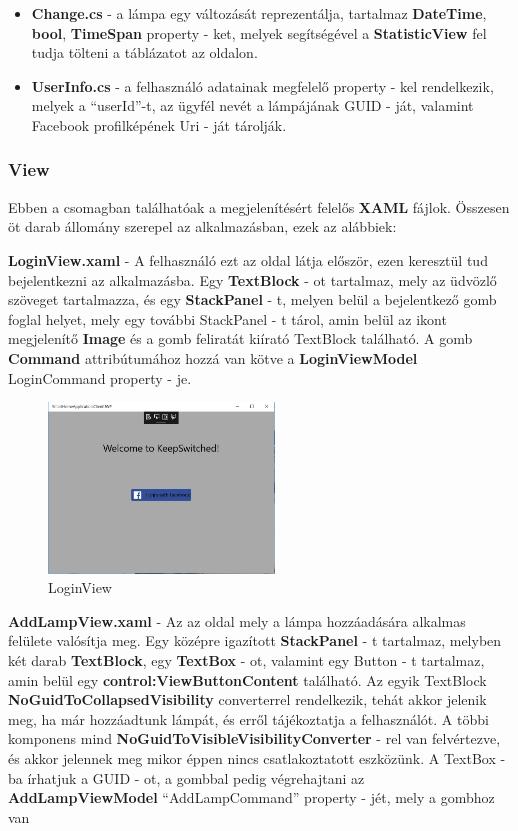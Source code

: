 \documentclass[a4paper,12pt]{report}
\begin{document}
\begin{itemize}
    \item \textbf{Change.cs} - a lámpa egy változását reprezentálja, tartalmaz \textbf{DateTime}, \textbf{bool}, \textbf{TimeSpan} property - ket,
    melyek segítségével a \textbf{StatisticView} fel tudja tölteni a táblázatot az oldalon.
    \item \textbf{UserInfo.cs} - a felhasználó adatainak megfelelő property - kel rendelkezik, melyek a ``userId''-t, az ügyfél nevét
    a lámpájának GUID -  ját, valamint Facebook profilképének Uri - ját tárolják.
\end{itemize}

\subsubsection{View}
    Ebben a csomagban találhatóak a megjelenítésért felelős \textbf{XAML} fájlok. Összesen öt darab állomány szerepel az alkalmazásban,
    ezek az alábbiek:

    \textbf{LoginView.xaml} - A felhasználó ezt az oldal látja először, ezen keresztül tud bejelentkezni az alkalmazásba. Egy \textbf{TextBlock} - ot
    tartalmaz, mely az üdvözlő szöveget tartalmazza, és egy \textbf{StackPanel} - t, melyen belül a bejelentkező gomb foglal helyet, mely egy további
    StackPanel - t tárol, amin belül az ikont megjelenítő \textbf{Image} és a gomb feliratát kiírató TextBlock található.  A gomb \textbf{Command}
    attribútumához hozzá van kötve a \textbf{LoginViewModel} LoginCommand property - je.

\begin{figure}[H]
    \centering
    \includegraphics[width=6cm,keepaspectratio]{images/loginview.jpg}
    \caption{LoginView}
    \label{fig: LoginView}
\end{figure}

    \textbf{AddLampView.xaml} - Az az oldal mely a lámpa hozzáadására alkalmas felülete valósítja meg. Egy középre igazított \textbf{StackPanel} - t
    tartalmaz, melyben két darab \textbf{TextBlock}, egy \textbf{TextBox} - ot, valamint egy Button - t tartalmaz, amin belül egy \textbf{control:ViewButtonContent}
    található. Az egyik TextBlock \textbf{NoGuidToCollapsedVisibility} converterrel rendelkezik, tehát akkor jelenik meg, ha már hozzáadtunk lámpát,
    és erről tájékoztatja a felhasználót. A többi komponens mind \textbf{NoGuidToVisibleVisibilityConverter} - rel van felvértezve, és akkor
    jelennek meg mikor éppen nincs csatlakoztatott eszközünk. A TextBox - ba írhatjuk a GUID - ot, a gombbal pedig végrehajtani az \textbf{AddLampViewModel}
    ``AddLampCommand'' property - jét, mely a gombhoz van
\end{document}
